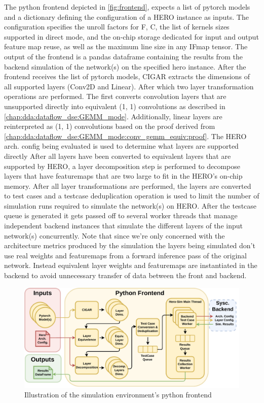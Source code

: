 The python frontend depicted in \autoref{fig:frontend}, expects a list of pytorch models and a dictionary defining the
configuration of a HERO instance as inputs. The configuration specifies the unroll factors
for F, C, the list of kernels sizes supported in direct mode, and the on-chip
storage dedicated for input and output feature map reuse, as well as the maximum
line size in any IFmap tensor.  The output of the
frontend is a pandas dataframe containing the results from the backend
simulation of the network(s) on the specified hero instance.  
After the frontend
receives the list of pytorch models, CIGAR extracts the dimensions of all
supported layers (Conv2D and Linear). After which two layer transformation
operations are performed. The first converts convolution layers that are
unsupported directly into equivalent (1, 1) convolutions as described in
\autoref{chap:dda:dataflow_dse:GEMM_mode}. Additionally, linear layers are
reinterpreted as (1, 1) convolutions based on the proof derived from
\autoref{chap:dda:dataflow_dse:GEMM_mode:conv_gemm_equiv:proof}. 
The HERO arch. config being
evaluated is used to determine what layers are supported directly
After all layers have been converted to equivalent layers
that are supported by HERO, a layer decomposition step is performed to
decompose layers that have featuremaps that are two large to fit in the
HERO's on-chip memory. 
After all layer transformations are
performed, the layers are converted to test cases and a testcase deduplication
operation is used to limit the number of simulation runs required to simulate the network(s)
on HERO. 
After the testcase queue is generated it gets passed off to several
worker threads that manage independent backend instances that simulate the different
layers of the input network(s) concurrently. Note that since we're only
concerned with the architecture metrics produced by the simulation the layers being
simulated don't use real weights and featuremaps from a forward inference pass
of the original network. Instead equivalent layer weights and featuremaps are
instantiated in the backend to avoid unnecessary transfer of data between the
front and backend.      


\begin{figure}[ht]
    \centering
    \includegraphics[scale=0.58]{fig/hero-sim-frontend.pdf}
    \caption{Illustration of the simulation environment's python frontend}
    \label{fig:frontend}
\end{figure}



